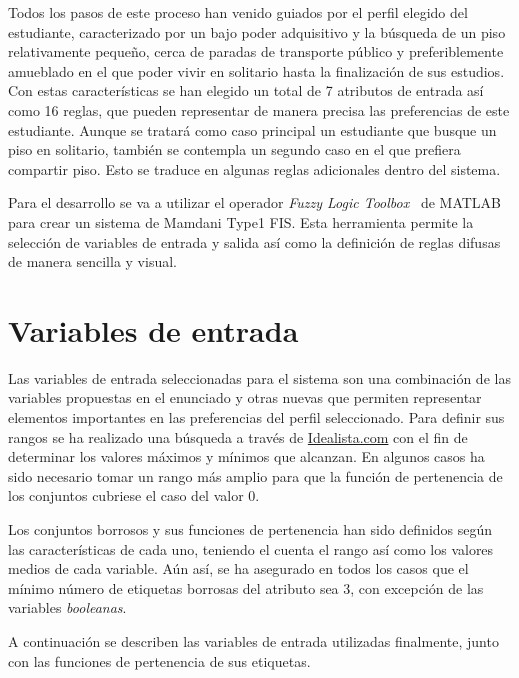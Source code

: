 \documentclass[12pt]{report} %
\begin{document}
        Todos los pasos de este proceso han venido guiados por el perfil
        elegido del estudiante, caracterizado por un bajo poder adquisitivo y
        la búsqueda de un piso relativamente pequeño, cerca de paradas de
        transporte público y preferiblemente amueblado en el que poder vivir en
        solitario hasta la finalización de sus estudios. Con estas
        características se han elegido un total de 7 atributos de entrada así
        como 16 reglas, que pueden representar de manera precisa las
        preferencias de este estudiante. Aunque se tratará como caso principal
        un estudiante que busque un piso en solitario, también se contempla un
        segundo caso en el que prefiera compartir piso. Esto se traduce en
        algunas reglas adicionales dentro del sistema. 
        
        Para el desarrollo se va
        a utilizar el operador \textit{Fuzzy Logic Toolbox}~\cite{fuzzy-docs}
        de MATLAB para crear un sistema de Mamdani Type1 FIS. Esta herramienta
        permite la selección de variables de entrada y salida así como la
        definición de reglas difusas de manera sencilla y visual.

    \section{Variables de entrada}

        Las variables de entrada seleccionadas para el sistema son una
        combinación de las variables propuestas en el enunciado y otras nuevas
        que permiten representar elementos importantes en las preferencias del
        perfil seleccionado. Para definir sus rangos se ha realizado una
        búsqueda a través de \href{https://www.idealista.com/}{Idealista.com}
        con el fin de determinar los valores máximos y mínimos que alcanzan. En
        algunos casos ha sido necesario tomar un rango más amplio para que la
        función de pertenencia de los conjuntos cubriese el caso del valor 0.

        Los conjuntos borrosos y sus funciones de pertenencia han sido
        definidos según las características de cada uno, teniendo el cuenta el
        rango así como los valores medios de cada variable. Aún así, se ha
        asegurado en todos los casos que el mínimo número de etiquetas borrosas del
        atributo sea 3, con excepción de las variables \textit{booleanas}.

        A continuación se describen las variables de entrada utilizadas finalmente, junto con las funciones de pertenencia de sus etiquetas. 
\end{document}
